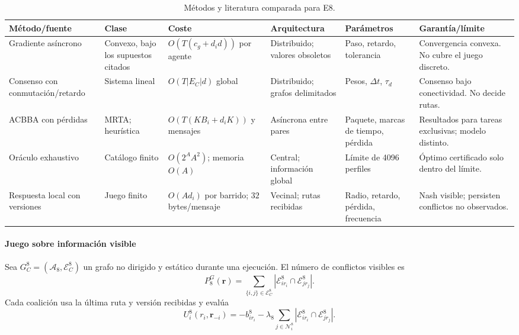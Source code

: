 \begin{table}[!htbp]
  \centering
  \caption{Métodos y literatura comparada para E8.}
  \label{tab:sp8-methods}
  \viutablefont
  \setlength{\tabcolsep}{1.3pt}
  \begin{tabularx}{\textwidth}{p{2.0cm} p{1.45cm} p{2.25cm} p{2.0cm} p{1.75cm} Y}
    \toprule
    Método/fuente & Clase & Coste & Arquitectura & Parámetros & Garantía/límite \\
    \midrule
    Gradiente asíncrono \parencite{tsitsiklis1986asynchronousOptimization} & Convexo, bajo los supuestos citados & $O(T(c_g+d_i d))$ por agente & Distribuido; valores obsoletos & Paso, retardo, tolerancia & Convergencia convexa. No cubre el juego discreto. \\
    Consenso con conmutación/retardo \parencite{olfatiSaber2004switchingConsensus} & Sistema lineal & $O(T|E_C|d)$ global & Distribuido; grafos delimitados & Pesos, $\Delta t$, $\tau_d$ & Consenso bajo conectividad. No decide rutas. \\
    ACBBA con pérdidas \parencite{rantanen2018lossyAcbba} & MRTA; heurística & $O(T(KB_i+d_iK))$ y mensajes & Asíncrona entre pares & Paquete, marcas de tiempo, pérdida & Resultados para tareas exclusivas; modelo distinto. \\
    Oráculo exhaustivo & Catálogo finito & $O(2^A A^2)$; memoria $O(A)$ & Central; información global & Límite de 4096 perfiles & Óptimo certificado solo dentro del límite. \\
    Respuesta local con versiones & Juego finito & $O(A d_i)$ por barrido; $32$ bytes/mensaje & Vecinal; rutas recibidas & Radio, retardo, pérdida, frecuencia & Nash visible; persisten conflictos no observados. \\
    \bottomrule
  \end{tabularx}
\end{table}

\paragraph{Juego sobre información visible}

Sea $G_C^8=(\mathcal A_8,\mathcal E_C^8)$ un grafo no dirigido y estático durante una ejecución. El número de conflictos visibles es
\[
 P_8^G(\boldsymbol r)=
 \sum_{\{i,j\}\in\mathcal E_C^8}
 |\mathcal E_{i r_i}^8\cap\mathcal E_{j r_j}^8|.
\]
Cada coalición usa la última ruta y versión recibidas y evalúa
\begin{equation}
 U_i^8(r_i,\boldsymbol r_{-i})=-b_{i r_i}^8
 -\lambda_8\sum_{j\in\mathcal N_i^8}
 |\mathcal E_{i r_i}^8\cap\mathcal E_{j r_j}^8|.
 \label{eq:sp8-visible-utility}
\end{equation}

